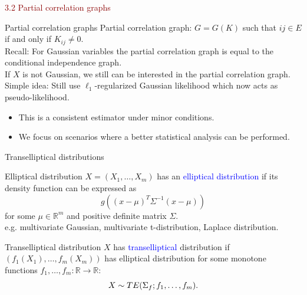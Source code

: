 \documentclass[dvipsnames,aspectratio=169]{beamer} %
\newcommand{\R}{\mathbb{R}}
\begin{document}
\begin{frame}{}
\begin{center}
	{\huge \textcolor{DarkRed}{3.2 Partial correlation graphs}}
\end{center}
\end{frame}


\begin{frame}{Partial correlation graphs}
 \alert{Partial correlation graph}: $G=G(K)$ such that $ij\in E$ if and only if $K_{ij}\neq 0$.\\[.3cm] 
	Recall: For Gaussian variables the partial correlation graph is equal to the \alert{conditional independence graph}.\\[.3cm]
	If $X$ is not Gaussian, we still can be interested in the partial correlation graph.\\[.3cm]
	Simple idea: Still use $\ell_1$-regularized Gaussian likelihood which now acts as pseudo-likelihood. 
	\begin{itemize}
		\item This is a consistent estimator under minor conditions.
		\item We focus on scenarios where a better statistical analysis can be performed.
	\end{itemize}
\end{frame}


%

\begin{frame}{Transelliptical distributions}
\begin{alertblock}{Elliptical distribution}
	$X=(X_1,\ldots,X_m)$ has an \textcolor{blue}{elliptical distribution} if its density function can be expressed as $$g((x-\mu)^T\Sigma^{-1}(x-\mu))$$
	for some $\mu\in \R^m$ and positive definite matrix $\Sigma$. \\[.2cm]
	e.g. multivariate Gaussian, multivariate t-distribution, Laplace distribution.
\end{alertblock}
\begin{alertblock}{Transelliptical distribution}
	$X$ has \textcolor{blue}{transelliptical} distribution if $(f_1(X_1),\ldots,f_m(X_m))$ has elliptical distribution for some monotone functions $f_1,\ldots,f_m:\R\to \R$: $$X\sim {\sc TE}(\Sigma_f; f_1,\ldots,f_m).$$
\end{alertblock}
\end{frame}
\end{document}
